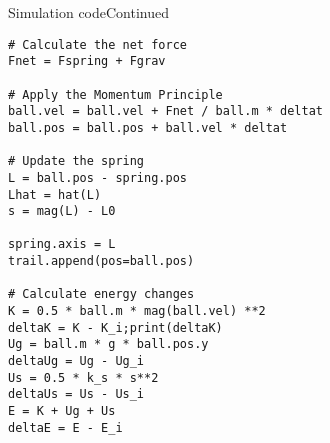 \begin{frame}[fragile]{Simulation code}{Continued}
\begin{verbatim}
# Calculate the net force
Fnet = Fspring + Fgrav

# Apply the Momentum Principle
ball.vel = ball.vel + Fnet / ball.m * deltat
ball.pos = ball.pos + ball.vel * deltat

# Update the spring
L = ball.pos - spring.pos
Lhat = hat(L) 
s = mag(L) - L0

spring.axis = L
trail.append(pos=ball.pos)

# Calculate energy changes
K = 0.5 * ball.m * mag(ball.vel) **2
deltaK = K - K_i;print(deltaK)
Ug = ball.m * g * ball.pos.y
deltaUg = Ug - Ug_i
Us = 0.5 * k_s * s**2
deltaUs = Us - Us_i
E = K + Ug + Us
deltaE = E - E_i
\end{verbatim}
\end{frame}
